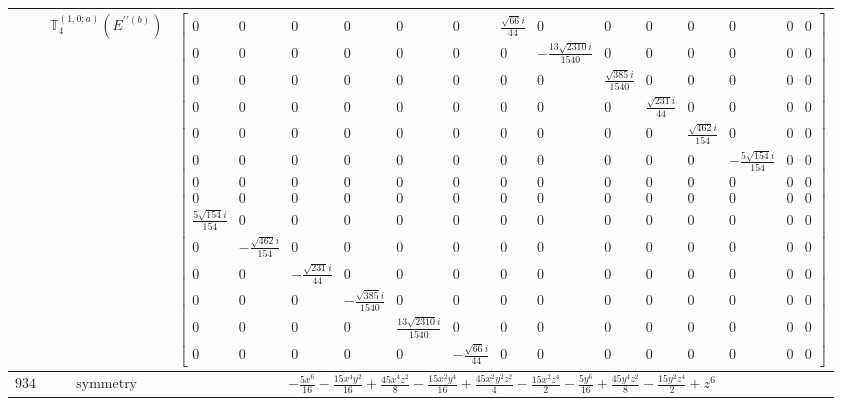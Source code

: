 \documentclass[fleqn,8pt,landscape]{jsarticle}
\begin{document}
\begin{longtable}{ccc}
$  $ & $ \mathbb{T}_{4}^{(1,0;a)}(E^{\prime\prime(b)}) $ & $ \begin{bmatrix} 0 & 0 & 0 & 0 & 0 & 0 & \frac{\sqrt{66} i}{44} & 0 & 0 & 0 & 0 & 0 & 0 & 0 \\ 0 & 0 & 0 & 0 & 0 & 0 & 0 & - \frac{13 \sqrt{2310} i}{1540} & 0 & 0 & 0 & 0 & 0 & 0 \\ 0 & 0 & 0 & 0 & 0 & 0 & 0 & 0 & \frac{\sqrt{385} i}{1540} & 0 & 0 & 0 & 0 & 0 \\ 0 & 0 & 0 & 0 & 0 & 0 & 0 & 0 & 0 & \frac{\sqrt{231} i}{44} & 0 & 0 & 0 & 0 \\ 0 & 0 & 0 & 0 & 0 & 0 & 0 & 0 & 0 & 0 & \frac{\sqrt{462} i}{154} & 0 & 0 & 0 \\ 0 & 0 & 0 & 0 & 0 & 0 & 0 & 0 & 0 & 0 & 0 & - \frac{5 \sqrt{154} i}{154} & 0 & 0 \\ 0 & 0 & 0 & 0 & 0 & 0 & 0 & 0 & 0 & 0 & 0 & 0 & 0 & 0 \\ 0 & 0 & 0 & 0 & 0 & 0 & 0 & 0 & 0 & 0 & 0 & 0 & 0 & 0 \\ \frac{5 \sqrt{154} i}{154} & 0 & 0 & 0 & 0 & 0 & 0 & 0 & 0 & 0 & 0 & 0 & 0 & 0 \\ 0 & - \frac{\sqrt{462} i}{154} & 0 & 0 & 0 & 0 & 0 & 0 & 0 & 0 & 0 & 0 & 0 & 0 \\ 0 & 0 & - \frac{\sqrt{231} i}{44} & 0 & 0 & 0 & 0 & 0 & 0 & 0 & 0 & 0 & 0 & 0 \\ 0 & 0 & 0 & - \frac{\sqrt{385} i}{1540} & 0 & 0 & 0 & 0 & 0 & 0 & 0 & 0 & 0 & 0 \\ 0 & 0 & 0 & 0 & \frac{13 \sqrt{2310} i}{1540} & 0 & 0 & 0 & 0 & 0 & 0 & 0 & 0 & 0 \\ 0 & 0 & 0 & 0 & 0 & - \frac{\sqrt{66} i}{44} & 0 & 0 & 0 & 0 & 0 & 0 & 0 & 0 \end{bmatrix} $ \\ \hline
$ 934 $ & $ \text{symmetry} $ & $ - \frac{5 x^{6}}{16} - \frac{15 x^{4} y^{2}}{16} + \frac{45 x^{4} z^{2}}{8} - \frac{15 x^{2} y^{4}}{16} + \frac{45 x^{2} y^{2} z^{2}}{4} - \frac{15 x^{2} z^{4}}{2} - \frac{5 y^{6}}{16} + \frac{45 y^{4} z^{2}}{8} - \frac{15 y^{2} z^{4}}{2} + z^{6} $ \\

\end{longtable}
\end{document}
